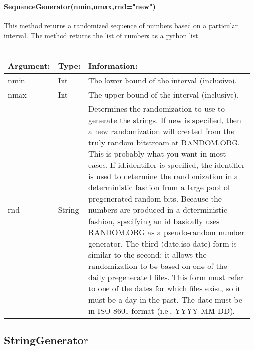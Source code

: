 \documentclass[12 pt]{report}
\begin{document}
\textbf{SequenceGenerator(nmin,nmax,rnd="new")}\\\\
This method returns a randomized sequence of numbers based on a particular interval. The method returns 
the list of numbers as a python list.\\\\
  \begin{tabular}{ | l | l | p{10cm} | }
    \hline
    \textbf{Argument:} & \textbf{Type:} & \textbf{Information:} \\ \hline
    nmin & Int &The lower bound of the interval (inclusive). \\ \hline
    nmax & Int &The upper bound of the interval (inclusive).\\ \hline
    rnd & String & Determines the randomization to use to generate the strings. If new is specified, then a new randomization will created from the truly random bitstream at RANDOM.ORG. This is probably what you want in most cases. If id.identifier is specified, the identifier is used to determine the randomization in a deterministic fashion from a large pool of pregenerated random bits. Because the numbers are produced in a deterministic fashion, specifying an id basically uses RANDOM.ORG as a pseudo-random number generator. The third (date.iso-date) form is similar to the second; it allows the randomization to be based on one of the daily pregenerated files. This form must refer to one of the dates for which files exist, so it must be a day in the past. The date must be in ISO 8601  format (i.e., YYYY-MM-DD). \\
    \hline
  \end{tabular}

\subsection{StringGenerator}
\end{document}
